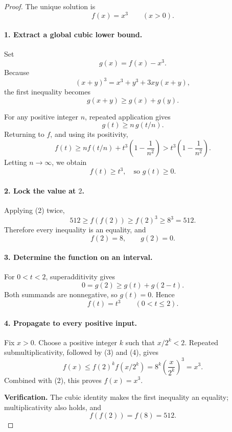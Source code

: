 
\begin{dlsummary}[title={\bfseries Solution 48. The One-Point Cubic Lock},breakable]

\begin{proof}
The unique solution is
\[
\boxed{f(x)=x^3\qquad(x>0).}
\]

\paragraph{1. Extract a global cubic lower bound.}

Set
\[
g(x)=f(x)-x^3.
\]
Because
\[
(x+y)^3=x^3+y^3+3xy(x+y),
\]
the first inequality becomes
\[
g(x+y)\ge g(x)+g(y). \tag{1}
\]

For any positive integer \(n\), repeated application gives
\[
g(t)\ge n\,g(t/n).
\]
Returning to \(f\), and using its positivity,
\[
f(t)\ge n f(t/n)+t^3\left(1-\frac1{n^2}\right)
>t^3\left(1-\frac1{n^2}\right).
\]
Letting \(n\to\infty\), we obtain
\[
\boxed{f(t)\ge t^3,\quad\text{so }g(t)\ge0.} \tag{2}
\]

\paragraph{2. Lock the value at \(2\).}

Applying (2) twice,
\[
512\ge f(f(2))\ge f(2)^3\ge8^3=512.
\]
Therefore every inequality is an equality, and
\[
\boxed{f(2)=8,\qquad g(2)=0.} \tag{3}
\]

\paragraph{3. Determine the function on an interval.}

For \(0<t<2\), superadditivity gives
\[
0=g(2)\ge g(t)+g(2-t).
\]
Both summands are nonnegative, so \(g(t)=0\). Hence
\[
\boxed{f(t)=t^3\qquad(0<t\le2).} \tag{4}
\]

\paragraph{4. Propagate to every positive input.}

Fix \(x>0\). Choose a positive integer \(k\) such that \(x/2^k<2\). Repeated submultiplicativity, followed by (3) and (4), gives
\[
f(x)
\le f(2)^k f(x/2^k)
=8^k\left(\frac{x}{2^k}\right)^3
=x^3.
\]
Combined with (2), this proves \(f(x)=x^3\).

\textbf{Verification.} The cubic identity makes the first inequality an equality; multiplicativity also holds, and
\[
f(f(2))=f(8)=512.
\]
\end{proof}
\end{dlsummary}

